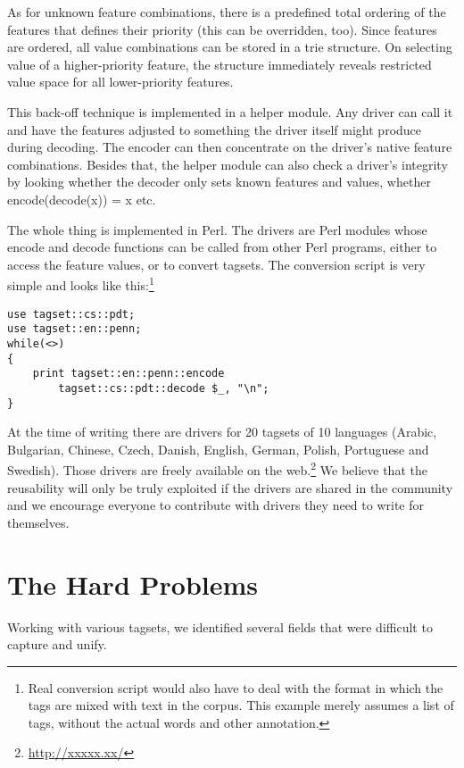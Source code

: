 \documentclass[11pt]{article}
\newcommand{\XXX}{\textcolor{red}{XXX }} %
\begin{document}
As for unknown feature combinations, there is a predefined total ordering of the features that defines their priority (this can be overridden, too). Since features are ordered, all value combinations can be stored in a trie structure. On selecting value of a higher-priority feature, the structure immediately reveals restricted value space for all lower-priority features.

This back-off technique is implemented in a helper module. Any driver can call it and have the features adjusted to something the driver itself might produce during decoding. The encoder can then concentrate on the driver’s native feature combinations. Besides that, the helper module can also check a driver’s integrity by looking whether the decoder only sets known features and values, whether encode(decode(x)) = x etc.

The whole thing is implemented in Perl. The drivers are Perl modules whose encode and decode functions can be called from other Perl programs, either to access the feature values, or to convert tagsets. The conversion script is very simple and looks like this:\footnote{Real conversion script would also have to deal with the format in which the tags are mixed with text in the corpus. This example merely assumes a list of tags, without the actual words and other annotation.}

\begin{lstlisting}
use tagset::cs::pdt;
use tagset::en::penn;
while(<>)
{
    print tagset::en::penn::encode
        tagset::cs::pdt::decode $_, "\n";
}
\end{lstlisting}

At the time of writing there are drivers for 20 tagsets of 10 languages (Arabic, Bulgarian, Chinese, Czech, Danish, English, German, Polish, Portuguese and Swedish). Those drivers are freely available on the web.\footnote{\url{http://xxxxx.xx/}}
We believe that the reusability will only be truly exploited if the drivers are shared in the community and we encourage everyone to contribute with drivers they need to write for themselves.

\section{The Hard Problems}
\label{sec:hard}

Working with various tagsets, we identified several fields that were difficult to capture and unify.

\end{document}
